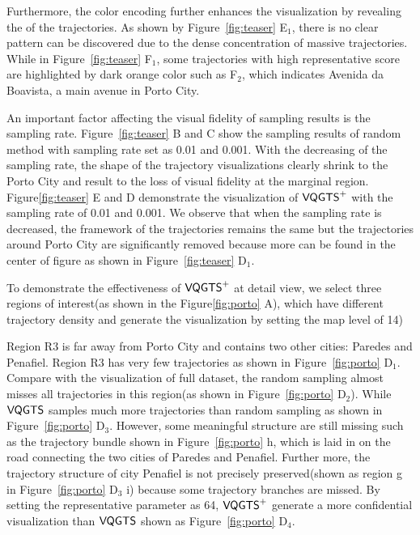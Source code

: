 Furthermore, the color encoding further enhances the visualization by revealing the  of the trajectories.
As shown by Figure~\ref{fig:teaser} E$_1$, there is no clear pattern can be discovered due to the dense concentration of massive trajectories. While in Figure~\ref{fig:teaser} F$_1$, some trajectories with high representative score are highlighted by dark orange color such as F$_2$, which indicates Avenida da Boavista, a main avenue in Porto City.


An important factor affecting the visual fidelity of sampling results is the sampling rate. Figure~\ref{fig:teaser} B and C show the sampling results of random method with sampling rate set as 0.01 and 0.001. With the decreasing of the sampling rate, the shape of the trajectory visualizations clearly shrink to the Porto City and result to the loss of visual fidelity at the marginal region. Figure\ref{fig:teaser} E and D demonstrate the visualization of $\mathsf{VQGTS}^{+}$ with the sampling rate of 0.01 and 0.001. We observe that when the sampling rate is decreased, the framework of the trajectories remains the same but the trajectories around Porto City are significantly removed because more  can be found in the center of figure as shown in Figure~\ref{fig:teaser} D$_1$.

To demonstrate the effectiveness of $\mathsf{VQGTS}^{+}$ at detail view, we select three regions of interest(as shown in the Figure\ref{fig:porto} A), which have different trajectory density and generate the visualization by setting the map level of 14)

Region R3 is far away from Porto City and contains two other cities: Paredes and Penafiel. Region R3 has very few trajectories as shown in Figure~\ref{fig:porto} D$_1$.  Compare with the visualization of full dataset, the random sampling almost misses all trajectories in this region(as shown in Figure~\ref{fig:porto} D$_2$). While $\mathsf{VQGTS}$ samples much more trajectories than random sampling as shown in Figure~\ref{fig:porto} D$_3$. However, some meaningful structure are still missing such as the trajectory bundle shown in Figure~\ref{fig:porto} h, which is laid in on the road  connecting the two cities of Paredes and Penafiel. Further more, the trajectory structure of city Penafiel is not precisely preserved(shown as region g in Figure~\ref{fig:porto} D$_3$ i) because some  trajectory branches are missed.
By setting the representative parameter as 64, $\mathsf{VQGTS}^{+}$ generate a more confidential visualization than $\mathsf{VQGTS}$ shown as Figure~\ref{fig:porto} D$_4$.

